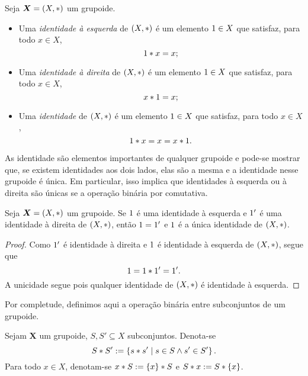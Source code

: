 \begin{definition}[Identidade]
Seja $\bm X=(X,\ast)$ um grupoide.
	\begin{itemize}
	\item Uma \emph{identidade à esquerda} de $(X, \ast)$ é um elemento $1 \in X$ que satisfaz, para todo $x \in X$,
		\begin{equation*}
		1 \ast x = x;
		\end{equation*}
	\item Uma \emph{identidade à direita} de $(X, \ast)$ é um elemento $1 \in X$ que satisfaz, para todo $x \in X$,
		\begin{equation*}
		x \ast 1 = x;
		\end{equation*}
	\item Uma \emph{identidade} de $(X, \ast)$ é um elemento $1 \in X$ que satisfaz, para todo $x \in X$,
		\begin{equation*}
		1 \ast x = x = x \ast 1.
		\end{equation*}
	\end{itemize}
\end{definition}

As identidade são elementos importantes de qualquer grupoide e pode-se mostrar que, se existem identidades aos dois lados, elas são a mesma e a identidade nesse grupoide é única. Em particular, isso implica que identidades à esquerda ou à direita são únicas se a operação binária por comutativa.

\begin{proposition}
\label{prop:unic.elem.neut}
Seja $\bm X = (X,\ast)$ um grupoide. Se $1$ é uma identidade à esquerda e $1'$ é uma identidade à direita de $(X, \ast)$, então $1 = 1'$ e $1$ é a única identidade de $(X,\ast)$.
\end{proposition}
\begin{proof}
Como $1'$ é identidade à direita e $1$ é identidade à esquerda de $(X, \ast)$, segue que
	\begin{equation*}
	1 = 1 \ast 1' = 1'.
	\end{equation*}
A unicidade segue pois qualquer identidade de $(X,\ast)$ é identidade à esquerda.
\end{proof}

Por completude, definimos aqui a operação binária entre subconjuntos de um grupoide.

\begin{definition}
Sejam $\bm X$ um grupoide, $S,S' \subseteq X$ subconjuntos. Denota-se
	\begin{equation*}
	S \ast S' := \left\{{s \ast s'}\;\middle\vert\;{s \in S \land s' \in S'}\right\}.
	\end{equation*}
Para todo $x \in X$, denotam-se $x \ast S := \{x\} \ast S$ e $S \ast x := S \ast \{x\}$.
\end{definition}

